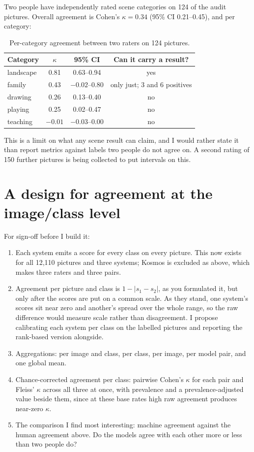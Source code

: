 \documentclass[11pt,a4paper]{article}
\begin{document}
Two people have independently rated scene categories on 124 of the audit pictures. Overall agreement
is Cohen's $\kappa = 0.34$ (95\% CI 0.21--0.45), and per category:

\begin{table}[h]
\centering
\begin{tabular}{lccc}
\toprule
Category & $\kappa$ & 95\% CI & Can it carry a result? \\
\midrule
landscape & 0.81 & 0.63--0.94 & yes \\
family & 0.43 & $-0.02$--0.80 & only just; 3 and 6 positives \\
drawing & 0.26 & 0.13--0.40 & no \\
playing & 0.25 & 0.02--0.47 & no \\
teaching & $-0.01$ & $-0.03$--0.00 & no \\
\bottomrule
\end{tabular}
\caption{Per-category agreement between two raters on 124 pictures.}
\end{table}

This is a limit on what any scene result can claim, and I would rather state it than report metrics
against labels two people do not agree on. A second rating of 150 further pictures is being collected
to put intervals on this.

\section{A design for agreement at the image/class level}

For sign-off before I build it:

\begin{enumerate}
\item Each system emits a score for every class on every picture. This now exists for all 12,110
      pictures and three systems; Kosmos is excluded as above, which makes three raters and three pairs.
\item Agreement per picture and class is $1 - |s_1 - s_2|$, as you formulated it, but only after the
      scores are put on a common scale. As they stand, one system's scores sit near zero and another's
      spread over the whole range, so the raw difference would measure scale rather than disagreement.
      I propose calibrating each system per class on the labelled pictures and reporting the
      rank-based version alongside.
\item Aggregations: per image and class, per class, per image, per model pair, and one global mean.
\item Chance-corrected agreement per class: pairwise Cohen's $\kappa$ for each pair and Fleiss'
      $\kappa$ across all three at once, with prevalence and a prevalence-adjusted value beside them,
      since at these base rates high raw agreement produces near-zero $\kappa$.
\item The comparison I find most interesting: machine agreement against the human agreement above. Do
      the models agree with each other more or less than two people do?
\end{enumerate}
\end{document}
